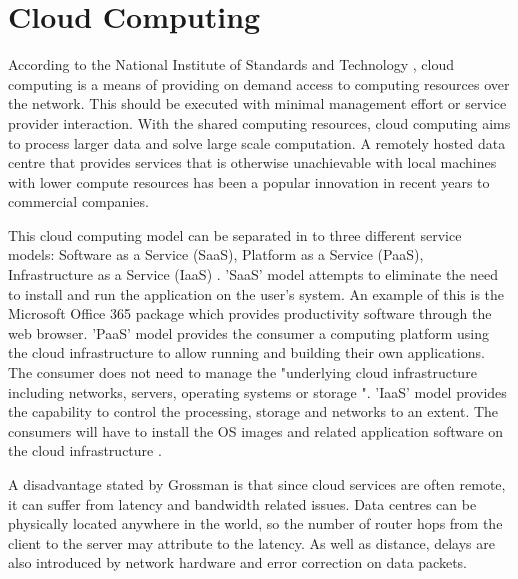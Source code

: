 \section{Cloud Computing}
According to the National Institute of Standards and Technology \cite{mell2011nist}, cloud computing is a means of providing on demand access to computing resources over the network.  This should be executed with minimal management effort or service provider interaction. With the shared computing resources, cloud computing aims to process larger data and solve large scale computation. A remotely hosted data centre that provides services that is otherwise unachievable with local machines with lower compute resources has been a popular innovation in recent years to commercial companies.
\newline
\par
This cloud computing model can be separated in to three different service models: Software as a Service (SaaS), Platform as a Service (PaaS), Infrastructure as a Service (IaaS) \cite{jadeja2012cloud}. 'SaaS' model attempts to eliminate the need to install and run the application on the user's system. An example of this is the Microsoft Office 365 package which provides productivity software through the web browser. 'PaaS' model provides the consumer a computing platform using the cloud infrastructure to allow running and building their own applications. The consumer does not need to manage the "underlying cloud infrastructure including networks, servers, operating systems or storage \cite{mell2011nist}". 'IaaS' model provides the capability to control the processing, storage and networks to an extent. The consumers will have to install the OS images and related application software on the cloud infrastructure \cite{cloudservices}.
\newline
\par
A disadvantage stated by Grossman \cite{grossman2009case} is that since cloud services are often remote, it can suffer from latency and bandwidth related issues. Data centres can be physically located anywhere in the world, so the number of router hops from the client to the server may attribute to the latency. As well as distance, delays are also introduced by network hardware and error correction on data packets.


